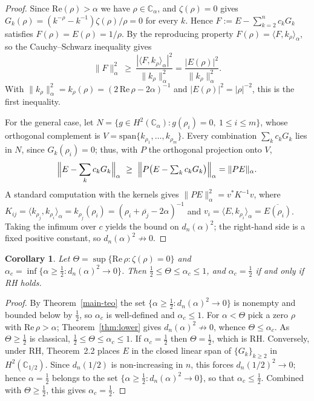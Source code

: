\documentclass[11pt]{extarticle}
\numberwithin{equation}{section}
\theoremstyle{plain}
\newtheorem{corollary}{Corollary}[section]
\theoremstyle{definition}
\begin{document}
\begin{proof}
Since $\mathrm{Re}(\rho) > \alpha$ we have $\rho \in \mathbb{C}_\alpha$, and
$\zeta(\rho) = 0$ gives $G_k(\rho) = (k^{-\rho} - k^{-1})\zeta(\rho)/\rho = 0$ for
every $k$. Hence $F := E - \sum_{k=2}^{n} c_k G_k$ satisfies
$F(\rho) = E(\rho) = 1/\rho$. By the reproducing property
$F(\rho) = \langle F, k_\rho \rangle_\alpha$, so the Cauchy--Schwarz inequality gives
\[
\|F\|^2_\alpha \ \geq\ \frac{|\langle F, k_\rho \rangle_\alpha|^2}{\|k_\rho\|^2_\alpha}
= \frac{|E(\rho)|^2}{\|k_\rho\|^2_\alpha}.
\]
With $\|k_\rho\|^2_\alpha = k_\rho(\rho) = (2\,\mathrm{Re}\,\rho - 2\alpha)^{-1}$ and
$|E(\rho)|^2 = |\rho|^{-2}$, this is the first inequality.

For the general case, let $N = \{ g \in H^2(\mathbb{C}_\alpha) : g(\rho_i) = 0,\
1 \leq i \leq m \}$, whose orthogonal complement is
$V = \mathrm{span}\{ k_{\rho_1}, \dots, k_{\rho_m} \}$. Every combination
$\sum_k c_k G_k$ lies in $N$, since $G_k(\rho_i) = 0$; thus, with $P$ the orthogonal
projection onto $V$,
\[
\Bigl\| E - \sum_k c_k G_k \Bigr\|_\alpha
\ \geq\ \Bigl\| P\bigl( E - \textstyle\sum_k c_k G_k \bigr) \Bigr\|_\alpha
= \| P E \|_\alpha.
\]
A standard computation with the kernels gives
$\| P E \|^2_\alpha = v^{*} K^{-1} v$, where
$K_{ij} = \langle k_{\rho_j}, k_{\rho_i} \rangle_\alpha = k_{\rho_j}(\rho_i)
= (\rho_i + \overline{\rho_j} - 2\alpha)^{-1}$ and
$v_i = \langle E, k_{\rho_i} \rangle_\alpha = \overline{E(\rho_i)}$. Taking the
infimum over $c$ yields the bound on $d_n(\alpha)^2$; the right-hand side is a fixed
positive constant, so $d_n(\alpha)^2 \not\to 0$.
\end{proof}

\begin{corollary}\label{cor:sensor}
Let $\Theta = \sup\{\mathrm{Re}\,\rho : \zeta(\rho) = 0\}$ and $\alpha_c = \inf\bigl\{\alpha \geq \tfrac12 : d_n(\alpha)^2 \to 0\bigr\}$. Then $\tfrac12 \leq \Theta \leq \alpha_c \leq 1$, and $\alpha_c = \tfrac12$ if and only if RH holds.
\end{corollary}

\begin{proof}
By Theorem~\ref{main-teo} the set $\{\alpha \geq \tfrac12 : d_n(\alpha)^2 \to 0\}$ is
nonempty and bounded below by $\tfrac12$, so $\alpha_c$ is well-defined and $\alpha_c \leq 1$.
For $\alpha < \Theta$ pick a zero $\rho$ with $\mathrm{Re}\,\rho > \alpha$;
Theorem~\ref{thm:lower} gives $d_n(\alpha)^2 \not\to 0$, whence $\Theta \leq \alpha_c$.
As $\Theta \geq \tfrac12$ is classical, $\tfrac12 \leq \Theta \leq \alpha_c \leq 1$. If
$\alpha_c = \tfrac12$ then $\Theta = \tfrac12$, which is RH. Conversely, under RH, Theorem~2.2 places $E$ in the closed linear span of
$\{G_k\}_{k\ge2}$ in $H^2(\mathbb{C}_{1/2})$. Since $d_n(1/2)$ is non-increasing
in $n$, this forces $d_n(1/2)^2\to0$; hence $\alpha=\tfrac12$ belongs to the set
$\{\alpha\ge\tfrac12:d_n(\alpha)^2\to0\}$, so that $\alpha_c\le\tfrac12$.
Combined with $\Theta\ge\tfrac12$, this gives $\alpha_c=\tfrac12$.
\end{proof}
\end{document}
